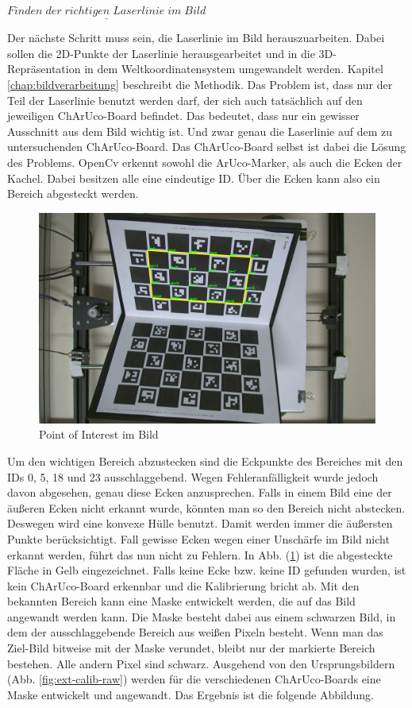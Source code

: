 		$\underline{Finden \; der \; richtigen \; Laserlinie \; im \; Bild}$
		
		Der nächste Schritt muss sein, die Laserlinie im Bild herauszuarbeiten. Dabei sollen die 2D-Punkte der Laserlinie herausgearbeitet und in die 3D-Repräsentation in dem Weltkoordinatensystem umgewandelt werden. Kapitel \ref{chap:bildverarbeitung} beschreibt die Methodik. Das Problem ist, dass nur der Teil der Laserlinie benutzt werden darf, der sich auch tatsächlich auf den jeweiligen ChArUco-Board befindet. Das bedeutet, dass nur ein gewisser Ausschnitt aus dem Bild wichtig ist. Und zwar genau die Laserlinie auf dem zu untersuchenden ChArUco-Board. \newline
		Das ChArUco-Board selbst ist dabei die Lösung des Problems. OpenCv erkennt sowohl die ArUco-Marker, als auch die Ecken der Kachel. Dabei besitzen alle eine eindeutige ID. Über die Ecken kann also ein Bereich abgesteckt werden.
		
		\begin{figure}[h]
			\centering
			\includegraphics[width=0.8\linewidth]{img/hauptteil/ext-calib/charuco_convex_hull_primary.png}
			\caption{Point of Interest im Bild}
			\label{fig:ext-calib-hull}
		\end{figure}
	
		Um den wichtigen Bereich abzustecken sind die Eckpunkte des Bereiches mit den IDs 0, 5, 18 und 23 ausschlaggebend. Wegen Fehleranfälligkeit wurde jedoch davon abgesehen, genau diese Ecken anzusprechen. Falls in einem Bild eine der äußeren Ecken nicht erkannt wurde, könnten man so den Bereich nicht abstecken. Deswegen wird eine konvexe Hülle benutzt. Damit werden immer die äußersten Punkte berücksichtigt. Fall gewisse Ecken wegen einer Unschärfe im Bild nicht erkannt werden, führt das nun nicht zu Fehlern. In Abb. (\ref{fig:ext-calib-hull}) ist die abgesteckte Fläche in Gelb eingezeichnet. Falls keine Ecke bzw. keine ID gefunden wurden, ist kein ChArUco-Board erkennbar und die Kalibrierung bricht ab. \newline
		Mit den bekannten Bereich kann eine Maske entwickelt werden, die auf das Bild angewandt werden kann. Die Maske besteht dabei aus einem schwarzen Bild, in dem der ausschlaggebende Bereich aus weißen Pixeln besteht. Wenn man das Ziel-Bild bitweise mit der Maske verundet, bleibt nur der markierte Bereich bestehen. Alle andern Pixel sind schwarz. Ausgehend von den Ursprungsbildern (Abb. \ref{fig:ext-calib-raw}) werden für die verschiedenen ChArUco-Boards eine Maske entwickelt und angewandt. Das Ergebnis ist die folgende Abbildung.
		
